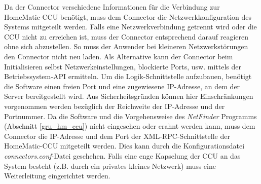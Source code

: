 Da der Connector verschiedene Informationen für die Verbindung zur HomeMatic-CCU benötigt,
muss dem Connector die Netzwerkkonfiguration des Systems mitgeteilt werden.
Falls eine Netzwerkverbindung getrennt wird oder die CCU nicht zu erreichen ist, muss der Connector
entsprechend darauf reagieren ohne sich abzustellen.
So muss der Anwender bei kleineren Netzwerkstörungen den Connector nicht neu laden.
Als Alternative kann der Connector beim Initialisieren selbst Netzwerkeinstellungen,
blockierte Ports, usw. mittels der Betriebssystem-API ermitteln.
Um die Logik-Schnittstelle aufzubauen, benötigt die Software einen freien Port und
eine zugewiesene IP-Adresse, an dem der Server bereitgestellt wird.
Aus Sicherheitsgründen können hier Einschränkungen vorgenommen werden bezüglich
der Reichweite der IP-Adresse und der Portnummer.
Da die Software und die Vorgehensweise des \emph{NetFinder} Programms (Abschnitt \ref{gru_hm_ccu})
nicht eingesehen oder erahnt werden kann, muss dem Connector die IP-Adresse und
dem Port der XML-RPC-Schnittstelle der HomeMatic-CCU mitgeteilt werden.
Dies kann durch die Konfigurationsdatei \emph{connectors.conf}-Datei geschehen.
Falls eine enge Kapselung der CCU an das System besteht (z.B. durch ein privates
kleines Netzwerk) muss eine Weiterleitung eingerichtet werden.
